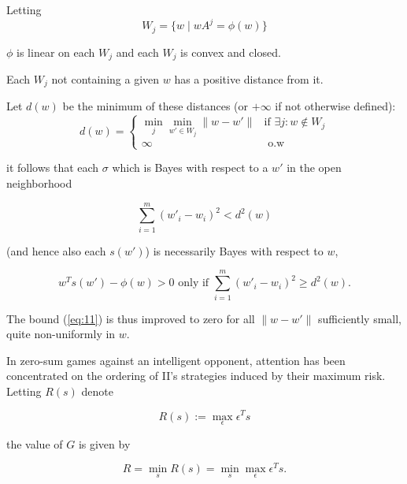 \documentclass[11pt]{article}
\theoremstyle{boldStyle}
\begin{document}
\bigbreak

Letting 
\begin{equation*}
    W_j = \{w \mid wA^j = \phi(w) \} 
\end{equation*}

\(\phi\) is linear on each \( W_j \) and each \( W_j \) is convex and closed. 


Each \( W_j \) not containing a given \( w \) has a positive distance from it. 

Let \( d(w) \) be the minimum of these distances (or \( + \infty \) if not otherwise defined):
\begin{equation*}
    d(w) = 
    \begin{cases}
        \min_{j} \min_{w' \in W_j} \|w - w'\| & \text{if } \exists j : w \notin W_j \\
        \infty & \text{ o.w }
    \end{cases}
\end{equation*}

\begin{bluebox}
it follows that each \(\sigma\) which is Bayes with respect to a \( w' \) in the open neighborhood

\begin{equation*}
\sum_{i=1}^{m} (w'_i - w_i)^2 < d^2(w)
\end{equation*}

(and hence also each  $s(w')$) is necessarily Bayes with respect to \( w \),

\begin{equation} \label{eq:15}
w^T s(w') - \phi(w) > 0 \text{ only if } \sum_{i=1}^{m} (w'_i - w_i)^2 \geq d^2(w).
\end{equation}
\end{bluebox}


The bound (\ref{eq:11}) is thus improved to zero for all \(\|w - w'\|\) sufficiently small, quite non-uniformly in \( w \).

\bigbreak

In zero-sum games against an intelligent opponent, attention has been concentrated on the ordering of II's 
strategies induced by their maximum risk. Letting \( R(s) \) denote

\begin{equation*}
    R(s) := \max_{\epsilon} \epsilon^T s
\end{equation*}

the value of \( G \) is given by

\begin{equation*}
    R = \min_{s} R(s) = \min_{s} \max_{\epsilon} \epsilon^T s.
\end{equation*}
\end{document}
